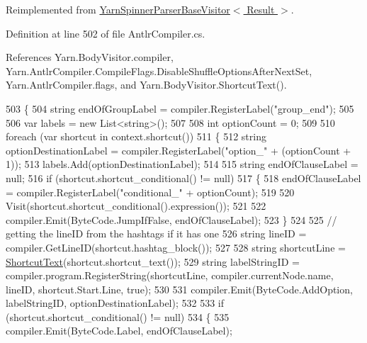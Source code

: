 Reimplemented from \hyperlink{a00191_a8299d25bc796f9c126635cf72aa3ea12}{Yarn\-Spinner\-Parser\-Base\-Visitor$<$ Result $>$}.



Definition at line 502 of file Antlr\-Compiler.\-cs.



References Yarn.\-Body\-Visitor.\-compiler, Yarn.\-Antlr\-Compiler.\-Compile\-Flags.\-Disable\-Shuffle\-Options\-After\-Next\-Set, Yarn.\-Antlr\-Compiler.\-flags, and Yarn.\-Body\-Visitor.\-Shortcut\-Text().


\begin{DoxyCode}
503         \{
504             \textcolor{keywordtype}{string} endOfGroupLabel = compiler.RegisterLabel(\textcolor{stringliteral}{"group\_end"});
505 
506             var labels = \textcolor{keyword}{new} List<string>();
507 
508             \textcolor{keywordtype}{int} optionCount = 0;
509 
510             \textcolor{keywordflow}{foreach} (var shortcut \textcolor{keywordflow}{in} context.shortcut())
511             \{
512                 \textcolor{keywordtype}{string} optionDestinationLabel = compiler.RegisterLabel(\textcolor{stringliteral}{"option\_"} + (optionCount + 1));
513                 labels.Add(optionDestinationLabel);
514 
515                 \textcolor{keywordtype}{string} endOfClauseLabel = null;
516                 \textcolor{keywordflow}{if} (shortcut.shortcut\_conditional() != null)
517                 \{
518                     endOfClauseLabel = compiler.RegisterLabel(\textcolor{stringliteral}{"conditional\_"} + optionCount);
519 
520                     Visit(shortcut.shortcut\_conditional().expression());
521 
522                     compiler.Emit(ByteCode.JumpIfFalse, endOfClauseLabel);
523                 \}
524 
525                 \textcolor{comment}{// getting the lineID from the hashtags if it has one}
526                 \textcolor{keywordtype}{string} lineID = compiler.GetLineID(shortcut.hashtag\_block());
527 
528                 \textcolor{keywordtype}{string} shortcutLine = \hyperlink{a00038_ad8448dacbbd94adebf38c29c3f50e499}{ShortcutText}(shortcut.shortcut\_text());
529                 \textcolor{keywordtype}{string} labelStringID = compiler.program.RegisterString(shortcutLine, 
      compiler.currentNode.name, lineID, shortcut.Start.Line, \textcolor{keyword}{true});
530 
531                 compiler.Emit(ByteCode.AddOption, labelStringID, optionDestinationLabel);
532 
533                 \textcolor{keywordflow}{if} (shortcut.shortcut\_conditional() != null)
534                 \{
535                     compiler.Emit(ByteCode.Label, endOfClauseLabel);

\end{DoxyCode}
